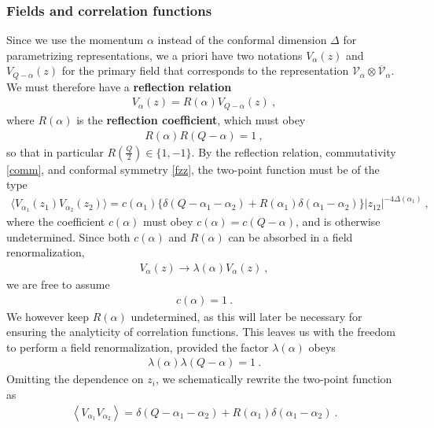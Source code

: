 \documentclass[12pt, a4paper, notitlepage, twoside]{report}
\numberwithin{equation}{section}
\theoremstyle{break}
\begin{document}
\subsubsection{Fields and correlation functions}

Since we
use the momentum $\alpha$ instead of the conformal dimension $\Delta$ for parametrizing representations, we a priori have two notations $V_\alpha(z)$ and $V_{Q-\alpha}(z)$ for the primary field that corresponds to the representation $\mathcal{V}_\alpha \otimes \overline{\mathcal{V}}_\alpha$.
We must therefore have a \textbf{\boldmath reflection relation}
\begin{align}
 \boxed{V_\alpha(z)= R(\alpha) V_{Q-\alpha}(z)}\ ,
\label{vrv}
\end{align}
where $R(\alpha)$ is the \textbf{\boldmath reflection coefficient}, which must obey 
\begin{align}
 R(\alpha)R(Q-\alpha)=1\ ,
\label{rrr}
\end{align}
so that in particular $R(\frac{Q}{2})\in\{1, -1\}$.
By the reflection relation, commutativity \eqref{comm}, and conformal symmetry \eqref{fzz}, the two-point function must be of the type 
\begin{align}
 \Big\langle V_{\alpha_1}(z_1) V_{\alpha_2}(z_2)\Big\rangle = c(\alpha_1) \Big\{ \delta(Q-\alpha_1-\alpha_2) + R(\alpha_1)\delta(\alpha_1-\alpha_2)\Big\} |z_{12}|^{-4\Delta(\alpha_1)}\ , 
\label{vvc}
\end{align}
where the coefficient $c(\alpha)$ must obey $c(\alpha)=c(Q-\alpha)$, and is otherwise undetermined.
Since both $c(\alpha)$ and $R(\alpha)$ can be absorbed in a field renormalization, 
\begin{align}
 V_\alpha(z) \to \lambda(\alpha)  V_\alpha(z) \ ,
\label{vlv}
\end{align}
we are free to assume
\begin{align}
 c(\alpha)=1\ .
\end{align}
We however keep $R(\alpha)$ undetermined, as this will later be necessary for ensuring the analyticity of correlation functions.
This leaves us with the freedom to perform a field renormalization, provided the factor $\lambda(\alpha)$ obeys
\begin{align}
 \lambda(\alpha)\lambda(Q-\alpha) = 1\ .
\label{llo}
\end{align}
Omitting the dependence on $z_i$, we schematically rewrite the two-point function as 
\begin{align}
 \boxed{\left\langle V_{\alpha_1}V_{\alpha_2} \right\rangle = \delta(Q-\alpha_1-\alpha_2) + R(\alpha_1)\delta(\alpha_1-\alpha_2) }\ .
\label{vvss}
\end{align}
\end{document}
